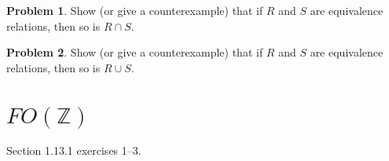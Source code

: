 \documentclass[10pt]{article}
\theoremstyle{definition}
\newtheorem{prob}{Problem}
\begin{document}
  \begin{prob}
    Show (or give a counterexample) that if $R$ and $S$ are equivalence relations, then so is $R \cap
    S$.
  \end{prob}
  
  
  \begin{prob}
    Show (or give a counterexample) that if $R$ and $S$ are equivalence relations, then so is
    $R \cup S$.
  \end{prob}
  
  
  \section*{$FO(\mathbb Z)$}
  
  Section 1.13.1 exercises 1--3.
  
  
  
\end{document}
